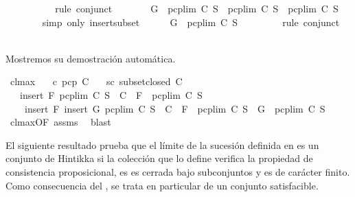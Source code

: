 \begin{isabellebody}
\ \ \ \ \ \ \isamarkupfalse%
\ {}\ \isamarkupfalse%
\ {\isacharparenleft}rule\ conjunct{}{\isacharparenright}\isanewline
\ \ \ \ \isamarkupfalse%
\ \isamarkupfalse%
\ {\isachardoublequoteopen}G\ {\isasymin}\ pcp{\isacharunderscore}lim\ C\ S\ {\isasymand}\ pcp{\isacharunderscore}lim\ C\ S\ {\isasymsubseteq}\ pcp{\isacharunderscore}lim\ C\ S{\isachardoublequoteclose}\ \isanewline
\ \ \ \ \ \ \isamarkupfalse%
\ {\isacharparenleft}simp\ only{\isacharcolon}\ insert{\isacharunderscore}subset{\isacharparenright}\isanewline
\ \ \ \ \isamarkupfalse%
\ {\isachardoublequoteopen}G\ {\isasymin}\ pcp{\isacharunderscore}lim\ C\ S{\isachardoublequoteclose}\ \isanewline
\ \ \ \ \ \ \isamarkupfalse%
\ {\isacharparenleft}rule\ conjunct{}{\isacharparenright}\isanewline
\ \ \isamarkupfalse%
\isanewline
{}\isamarkupfalse%
%
\endisatagproof
{\isafoldproof}%
%
\isadelimproof
%
\endisadelimproof
%
\begin{isamarkuptext}%
Mostremos su demostración automática.%
\end{isamarkuptext}\isamarkuptrue%
\isamarkupfalse%
\ cl{\isacharunderscore}max{\isacharprime}{\isacharcolon}\isanewline
\ \ \ c{\isacharcolon}\ {\isachardoublequoteopen}pcp\ C{\isachardoublequoteclose}\isanewline
\ \ \ sc{\isacharcolon}\ {\isachardoublequoteopen}subset{\isacharunderscore}closed\ C{\isachardoublequoteclose}\isanewline
\ \ \ {\isachardoublequoteopen}insert\ F\ {\isacharparenleft}pcp{\isacharunderscore}lim\ C\ S{\isacharparenright}\ {\isasymin}\ C\ {\isasymLongrightarrow}\ F\ {\isasymin}\ pcp{\isacharunderscore}lim\ C\ S{\isachardoublequoteclose}\isanewline
\ \ \ \ {\isachardoublequoteopen}insert\ F\ {\isacharparenleft}insert\ G\ {\isacharparenleft}pcp{\isacharunderscore}lim\ C\ S{\isacharparenright}{\isacharparenright}\ {\isasymin}\ C\ {\isasymLongrightarrow}\ F\ {\isasymin}\ pcp{\isacharunderscore}lim\ C\ S\ {\isasymand}\ G\ {\isasymin}\ pcp{\isacharunderscore}lim\ C\ S{\isachardoublequoteclose}\isanewline
%
\isadelimproof
\ \ %
\endisadelimproof
%
\isatagproof
{}\isamarkupfalse%
\ cl{\isacharunderscore}max{\isacharbrackleft}OF\ assms{\isacharbrackright}\ \isamarkupfalse%
\ blast{\isacharplus}%
\endisatagproof
{\isafoldproof}%
%
\isadelimproof
%
\endisadelimproof
%
\begin{isamarkuptext}%
El siguiente resultado prueba que el límite de la sucesión definida en  es un conjunto
  de Hintikka si la colección que lo define verifica la propiedad de consistencia proposicional, es
  es cerrada bajo subconjuntos y es de carácter finito. Como consecuencia del ,
  se trata en particular de un conjunto satisfacible. 


\end{isamarkuptext}
\end{isabellebody}
